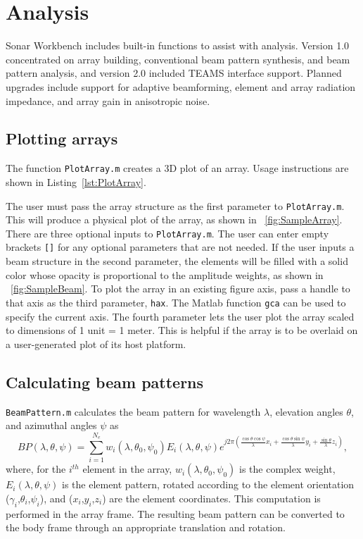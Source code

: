\section{Analysis}\label{sec:analysis}

Sonar Workbench includes built-in functions to assist with analysis.  Version 1.0 concentrated on array building, conventional beam pattern synthesis, and beam pattern analysis, and version 2.0 included TEAMS interface support.  Planned upgrades include support for adaptive beamforming, element and array radiation impedance, and array gain in anisotropic noise.

\subsection{Plotting arrays}

The function \texttt{PlotArray.m} creates a 3D plot of an array. Usage instructions are shown in Listing~\ref{lst:PlotArray}.


 
The user must pass the array structure as the first parameter to \texttt{PlotArray.m}. This will produce a physical plot of the array, as shown in \figname~\ref{fig:SampleArray}. There are three optional inputs to \texttt{PlotArray.m}. The user can enter empty brackets \texttt{[]} for any optional parameters that are not needed. If the user inputs a beam structure in the second parameter, the elements will be filled with a solid color whose opacity is proportional to the amplitude weights, as shown in \figname~\ref{fig:SampleBeam}. To plot the array in an existing figure axis, pass a handle to that axis as the third parameter, \texttt{hax}. The Matlab function \texttt{gca} can be used to specify the current axis. The fourth parameter lets the user plot the array scaled to dimensions of 1 unit = 1 meter. This is helpful if the array is to be overlaid on a user-generated plot of its host platform. 
 
\subsection{Calculating beam patterns}

\texttt{BeamPattern.m} calculates the beam pattern for wavelength $\lambda$, elevation angles $\theta$, and azimuthal angles $\psi$ as
\begin{equation}
BP(\lambda,\theta,\psi) = \sum_{i=1}^{N_e} w_i(\lambda,\theta_0,\psi_0)E_i(\lambda,\theta,\psi)e^{j2\pi\left(\frac{\cos\theta\cos\psi}{\lambda}x_i + \frac{\cos\theta\sin\psi}{\lambda}y_i + \frac{\sin\theta}{\lambda}z_i\right)},
\end{equation}
where, for the $i^{th}$ element in the array, $w_i(\lambda,\theta_0,\psi_0)$ is the complex weight, $E_i(\lambda,\theta,\psi)$ is the element pattern, rotated according to the element orientation ($\gamma_i$,$\theta_i$,$\psi_i$), and ($x_i$,$y_i$,$z_i$) are the element coordinates. This computation is performed in the array frame. The resulting beam pattern can be converted to the body frame through an appropriate translation and rotation.

